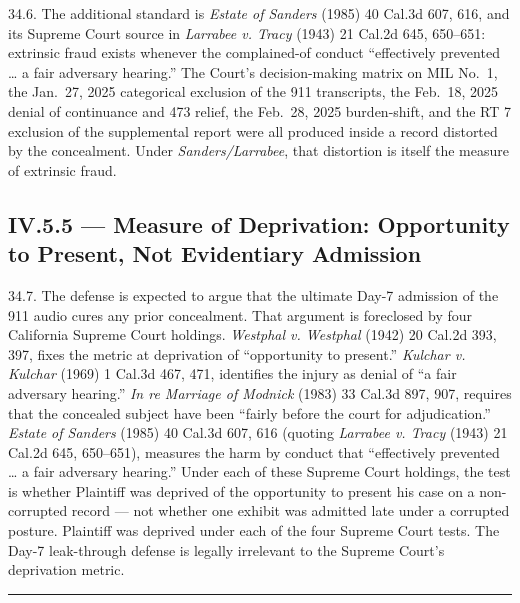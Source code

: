 34.6. The additional standard is \emph{Estate of Sanders} (1985) 40 Cal.3d 607, 616, and its Supreme Court source in \emph{Larrabee v. Tracy} (1943) 21 Cal.2d 645, 650--651: extrinsic fraud exists whenever the complained-of conduct ``effectively prevented \ldots{} a fair adversary hearing.'' The Court's decision-making matrix on MIL No.~1, the Jan.~27, 2025 categorical exclusion of the 911 transcripts, the Feb.~18, 2025 denial of continuance and \textsection{} 473 relief, the Feb.~28, 2025 burden-shift, and the RT 7 exclusion of the supplemental report were all produced inside a record distorted by the concealment. Under \emph{Sanders/Larrabee}, that distortion is itself the measure of extrinsic fraud.

\subsection{\textsection{}IV.5.5 --- Measure of Deprivation: Opportunity to Present, Not Evidentiary Admission}\label{iv.5.5-measure-of-deprivation-opportunity-to-present-not-evidentiary-admission}

34.7. The defense is expected to argue that the ultimate Day-7 admission of the 911 audio cures any prior concealment. That argument is foreclosed by four California Supreme Court holdings. \emph{Westphal v. Westphal} (1942) 20 Cal.2d 393, 397, fixes the metric at deprivation of ``opportunity to present.'' \emph{Kulchar v. Kulchar} (1969) 1 Cal.3d 467, 471, identifies the injury as denial of ``a fair adversary hearing.'' \emph{In re Marriage of Modnick} (1983) 33 Cal.3d 897, 907, requires that the concealed subject have been ``fairly before the court for adjudication.'' \emph{Estate of Sanders} (1985) 40 Cal.3d 607, 616 (quoting \emph{Larrabee v. Tracy} (1943) 21 Cal.2d 645, 650--651), measures the harm by conduct that ``effectively prevented \ldots{} a fair adversary hearing.'' Under each of these Supreme Court holdings, the test is whether Plaintiff was deprived of the opportunity to present his case on a non-corrupted record --- not whether one exhibit was admitted late under a corrupted posture. Plaintiff was deprived under each of the four Supreme Court tests. The Day-7 leak-through defense is legally irrelevant to the Supreme Court's deprivation metric.

\begin{center}\rule{0.5\linewidth}{0.5pt}\end{center}

\label{toc:section-vi-tiered-prayer-for-relief}
